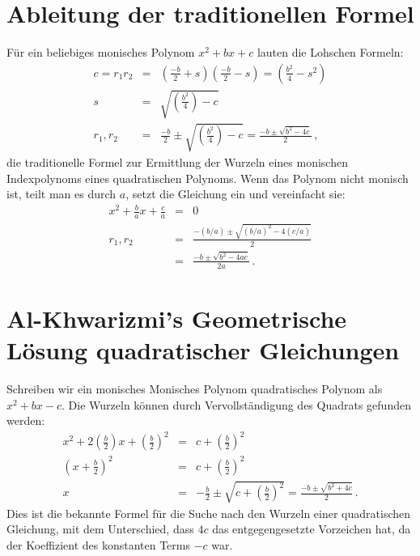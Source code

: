 \section{Ableitung der traditionellen Formel}\label{s.general}
Für ein beliebiges monisches Polynom $x^2+bx+c$ lauten die Lohschen Formeln:
\begin{eqnarray*}
c=r_1r_2&=&\left(\frac{-b}{2}+s\right)  \left(\frac{-b}{2}-s\right)=\left(\frac{b^2}{4}-s^2\right)\\
s&=&\sqrt{\left(\frac{b^2}{4}\right)-c}\\
r_1,r_2&=&\frac{-b}{2}\pm\sqrt{\left(\frac{b^2}{4}\right)-c}=\frac{-b\pm\sqrt{b^2-4c}}{2}\,,
\end{eqnarray*}
die traditionelle Formel zur Ermittlung der Wurzeln eines monischen Indexpolynoms eines quadratischen Polynoms. Wenn das Polynom nicht monisch ist, teilt man es durch $a$, setzt die Gleichung ein und vereinfacht sie:
\begin{eqnarray*}
x^2+\frac{b}{a}x+\frac{c}{a}&=&0\\
r_1,r_2&=&\frac{-(b/a)\pm\sqrt{(b/a)^2-4(c/a)}}{2}\\
&=&\frac{-b\pm\sqrt{b^2-4ac}}{2a}\,.
\end{eqnarray*}

\section{Al-Khwarizmi's Geometrische Lösung quadratischer Gleichungen}\label{s.khwar}

Schreiben wir ein monisches {Monisches Polynom} quadratisches Polynom als $x^2+bx-c$. Die Wurzeln können durch Vervollständigung des Quadrats gefunden werden:
\begin{eqnarray*}
x^2+2\left(\frac{b}{2}\right)x+\left(\frac{b}{2}\right)^2&=&c+\left(\frac{b}{2}\right)^2\\
\left(x+\frac{b}{2}\right)^2&=&c+\left(\frac{b}{2}\right)^2\\
x&=&-\frac{b}{2}\pm\sqrt{c+\left(\frac{b}{2}\right)^2}=
\frac{-b\pm\sqrt{b^2+4c}}{2}\,.
\end{eqnarray*}
Dies ist die bekannte Formel für die Suche nach den Wurzeln einer quadratischen Gleichung, mit dem Unterschied, dass $4c$ das entgegengesetzte Vorzeichen hat, da der Koeffizient des konstanten Terms $-c$ war.

